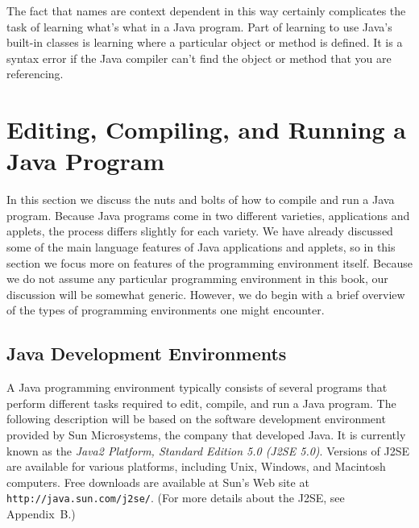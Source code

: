 

\noindent The fact that names are context dependent in this way certainly
complicates the task of learning what's what in a Java program.   Part
of learning to use Java's built-in classes is learning where a
particular object or method is defined.  It is a syntax error if the
Java compiler can't find the object or method that you are
referencing.


\section{Editing, Compiling, and 
Running a Java Program}

\noindent In this section we discuss the nuts and bolts of 
how to compile and run a Java program. Because Java programs come in
two different varieties, applications and applets, the process differs
slightly for each variety.  We have already discussed some of the main
language features of Java applications and applets, so in this section
we focus more on features of the programming environment itself.
Because we do not assume any particular programming environment in
this book, our discussion will be somewhat generic.  However,
we do begin with a brief overview of the types of programming
environments one might encounter.

\subsection{Java Development Environments}

\noindent A Java programming environment typically consists of several 
programs that perform different tasks required to edit, compile, and
run a Java program.  The following description will be based on the
software development environment provided by Sun Microsystems, the
company that developed Java. It is currently known as the {\it Java2
Platform, Standard Edition 5.0 (J2SE 5.0)}. Versions of J2SE are
available for various platforms, including Unix, Windows, and
Macintosh computers.  Free downloads are available at Sun's Web site
at {\tt http://java.sun.com/j2se/}. (For more details about the J2SE,
see Appendix~B.)

